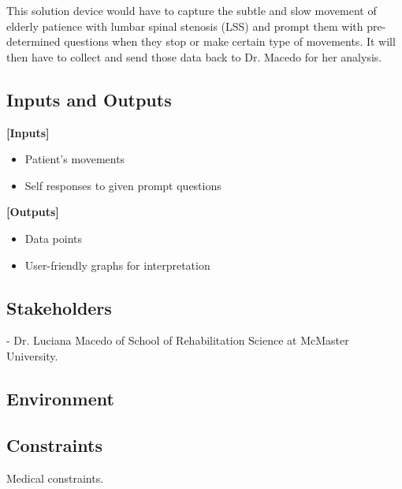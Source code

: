 \documentclass{article}
\begin{document}
This solution device would have to capture the subtle and slow movement of elderly patience with lumbar spinal stenosis (LSS) and prompt them with pre-determined questions when they stop or make certain type of  movements. It will then have to collect and send those data back to Dr. Macedo for her analysis.

\subsection{Inputs and Outputs}

\textbf{[Inputs]}
\begin{itemize}
\item Patient's movements
\item Self responses to given prompt questions
\end{itemize}

\textbf{[Outputs]}
\begin{itemize}
\item Data points
\item User-friendly graphs for interpretation
\end{itemize}

\subsection{Stakeholders}

- Dr. Luciana Macedo of School of Rehabilitation Science at McMaster University.

\subsection{Environment}

\subsection{Constraints}
Medical constraints.
\end{document}
